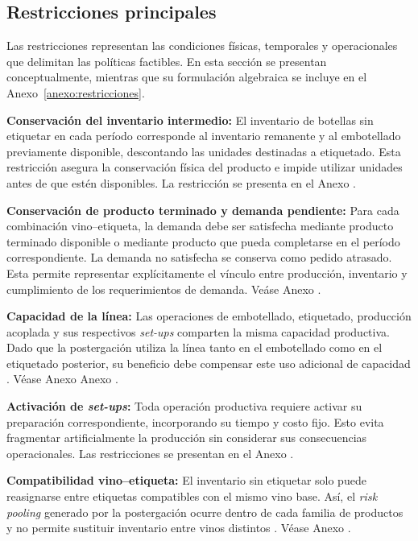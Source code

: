 \subsection{Restricciones principales}

Las restricciones representan las condiciones físicas, temporales y operacionales
que delimitan las políticas factibles. En esta sección se presentan
conceptualmente, mientras que su formulación algebraica se incluye en el
Anexo~\ref{anexo:restricciones}.

\medskip
\noindent\textbf{Conservación del inventario intermedio: } El inventario de botellas sin etiquetar en cada período corresponde al inventario remanente y al embotellado previamente disponible, descontando las unidades destinadas a etiquetado. Esta restricción asegura la conservación física del producto e impide utilizar unidades antes de que estén disponibles. La restricción se presenta en el Anexo .

\medskip
\noindent\textbf{Conservación de producto terminado y demanda pendiente: }Para cada combinación vino--etiqueta, la demanda debe ser satisfecha mediante producto terminado disponible o mediante producto que pueda completarse en el período correspondiente. La demanda no satisfecha se conserva como pedido atrasado. Esta permite representar explícitamente el vínculo entre producción, inventario y cumplimiento de los requerimientos de demanda. Veáse Anexo .

\medskip
\noindent\textbf{Capacidad de la línea: }Las operaciones de embotellado, etiquetado, producción acoplada y sus respectivos \textit{set-ups} comparten la misma capacidad productiva. Dado que la postergación utiliza la línea tanto en el embotellado como en el etiquetado posterior, su beneficio debe compensar este uso adicional de capacidad
\citep{maccawley2022}. 
Véase Anexo Anexo .

\medskip
\noindent\textbf{Activación de \textit{set-ups}: }Toda operación productiva requiere activar su preparación correspondiente,
incorporando su tiempo y costo fijo. Esto evita fragmentar artificialmente la
producción sin considerar sus consecuencias operacionales. Las restricciones
se presentan en el Anexo .

\medskip
\noindent\textbf{Compatibilidad vino--etiqueta: }El inventario sin etiquetar solo puede reasignarse entre etiquetas compatibles
con el mismo vino base. Así, el \textit{risk pooling} generado por la
postergación ocurre dentro de cada familia de productos y no permite sustituir
inventario entre vinos distintos \citep{cholette2009,varas2018}. Véase Anexo .

